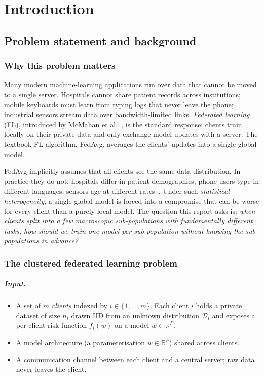 \chapter{Introduction}\label{ch:introduction}

\section{Problem statement and background}\label{sec:problem-statement}

\subsection*{Why this problem matters}

Many modern machine-learning applications run over data that cannot be moved to a single server. Hospitals cannot share patient records across institutions; mobile keyboards must learn from typing logs that never leave the phone; industrial sensors stream data over bandwidth-limited links. \emph{Federated learning} (FL), introduced by McMahan et al.~\parencite{mcmahan2017fedavg}, is the standard response: clients train locally on their private data and only exchange model updates with a server. The textbook FL algorithm, FedAvg, averages the clients' updates into a single global model.

FedAvg implicitly assumes that all clients see the same data distribution. In practice they do not: hospitals differ in patient demographics, phone users type in different languages, sensors age at different rates~\parencite{li2020heterogeneity}. Under such \emph{statistical heterogeneity}, a single global model is forced into a compromise that can be worse for every client than a purely local model. The question this report asks is: \emph{when clients split into a few macroscopic sub-populations with fundamentally different tasks, how should we train one model per sub-population without knowing the sub-populations in advance?}

\subsection*{The clustered federated learning problem}

\paragraph{Input.}
\begin{itemize}
    \item A set of $m$ \emph{clients} indexed by $i \in \{1, \dots, m\}$. Each client $i$ holds a private dataset of size $n_i$ drawn IID from an unknown distribution $\mathcal{D}_i$ and exposes a per-client risk function $f_i(w)$ on a model $w \in \mathbb{R}^P$.
    \item A model architecture (a parameterisation $w \in \mathbb{R}^P$) shared across clients.
    \item A communication channel between each client and a central server; raw data never leaves the client.
\end{itemize}

